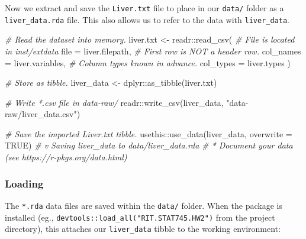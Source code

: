 \documentclass[
  11pt,
  a4paper,
]{scrartcl}
\newenvironment{Shaded}{\begin{snugshade}}{\end{snugshade}}
\newcommand{\AttributeTok}[1]{\textcolor[rgb]{0.77,0.63,0.00}{#1}}
\newcommand{\CommentTok}[1]{\textcolor[rgb]{0.56,0.35,0.01}{\textit{#1}}}
\newcommand{\ConstantTok}[1]{\textcolor[rgb]{0.00,0.00,0.00}{#1}}
\newcommand{\FunctionTok}[1]{\textcolor[rgb]{0.00,0.00,0.00}{#1}}
\newcommand{\NormalTok}[1]{#1}
\newcommand{\OtherTok}[1]{\textcolor[rgb]{0.56,0.35,0.01}{#1}}
\newcommand{\SpecialCharTok}[1]{\textcolor[rgb]{0.00,0.00,0.00}{#1}}
\newcommand{\StringTok}[1]{\textcolor[rgb]{0.31,0.60,0.02}{#1}}
\begin{document}
Now we extract and save the \texttt{Liver.txt} file to place in our
\texttt{data/} folder as a \texttt{liver\_data.rda} file. This also
allows us to refer to the data with \texttt{liver\_data}.

\begin{Shaded}
\begin{Highlighting}[]
\CommentTok{\# Read the dataset into memory.}
\NormalTok{liver.txt }\OtherTok{\textless{}{-}}\NormalTok{ readr}\SpecialCharTok{::}\FunctionTok{read\_csv}\NormalTok{(}
  \CommentTok{\# File is located in inst/extdata}
  \AttributeTok{file =}\NormalTok{ liver.filepath,}
  \CommentTok{\# First row is NOT a header row.}
  \AttributeTok{col\_names =}\NormalTok{ liver.variables,}
  \CommentTok{\# Column types known in advance.}
  \AttributeTok{col\_types =}\NormalTok{ liver.types}
\NormalTok{)}
\end{Highlighting}
\end{Shaded}

\begin{Shaded}
\begin{Highlighting}[]
\CommentTok{\# Store as tibble.}
\NormalTok{liver\_data }\OtherTok{\textless{}{-}}\NormalTok{ dplyr}\SpecialCharTok{::}\FunctionTok{as\_tibble}\NormalTok{(liver.txt)}

\CommentTok{\# Write *.csv file in data{-}raw/}
\NormalTok{readr}\SpecialCharTok{::}\FunctionTok{write\_csv}\NormalTok{(liver\_data, }\StringTok{"data{-}raw/liver\_data.csv"}\NormalTok{)}

\CommentTok{\# Save the imported Liver.txt tibble.}
\NormalTok{usethis}\SpecialCharTok{::}\FunctionTok{use\_data}\NormalTok{(liver\_data, }\AttributeTok{overwrite =} \ConstantTok{TRUE}\NormalTok{)}
\CommentTok{\# v Saving \textquotesingle{}liver\_data\textquotesingle{} to \textquotesingle{}data/liver\_data.rda\textquotesingle{}}
\CommentTok{\# * Document your data (see \textquotesingle{}https://r{-}pkgs.org/data.html\textquotesingle{})}
\end{Highlighting}
\end{Shaded}

\hypertarget{loading}{%
\subsubsection{Loading}\label{loading}}

The \texttt{*.rda} data files are saved within the \texttt{data/}
folder. When the package is installed (eg.,
\texttt{devtools::load\_all("RIT.STAT745.HW2")} from the project
directory), this attaches our \texttt{liver\_data} tibble to the working
environment:
\end{document}

